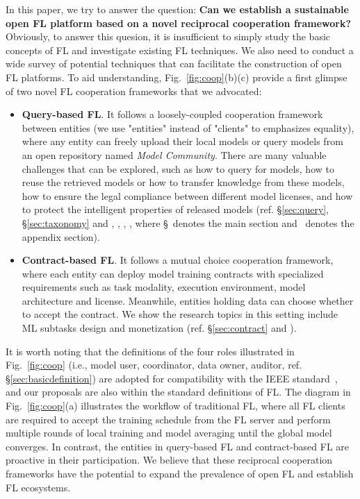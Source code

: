 In this paper, we try to answer the question: \textbf{Can we establish a sustainable open FL platform based on a novel reciprocal cooperation framework?}
Obviously, to answer this quesion, it is insufficient to simply study the basic concepts of FL and investigate existing FL techniques.
We also need to conduct a wide survey of potential techniques that can facilitate the construction of open FL platforms.
To aid understanding, Fig.~\ref{fig:coop}(b)(c) provide a first glimpse of two novel FL cooperation frameworks that we advocated: 
\begin{itemize}
    \item \textbf{Query-based FL}. It follows a loosely-coupled cooperation framework between entities (we use "entities" instead of "clients" to emphasizes equality), where any entity can freely upload their local models or query models from an open repository named \textit{Model Community}.
    There are many valuable challenges that can be explored, such as how to query for models, how to reuse the retrieved models or how to transfer knowledge from these models, how to ensure the legal compliance between different model licenses, and how to protect the intelligent properties of released models (ref. \S\ref{sec:query}, \S\ref{sec:taxonomy} and , , , , where \S~denotes the main section and \ddag~denotes the appendix section). %
    \item \textbf{Contract-based FL}. It follows a mutual choice cooperation framework, where each entity can deploy model training contracts with specialized requirements such as task modality, execution environment, model architecture and license. Meanwhile, entities holding data can choose whether to accept the contract.
    We show the research topics in this setting include ML subtasks design and monetization (ref. \S\ref{sec:contract} and ).
\end{itemize}
It is worth noting that the definitions of the four roles illustrated in Fig.~\ref{fig:coop} (i.e., model user, coordinator, data owner, auditor, ref. \S\ref{sec:basicdefinition}) are adopted for compatibility with the IEEE standard~\cite{IEEEstd3652}, and our proposals are also within the standard definitions of FL.
The diagram in Fig.~\ref{fig:coop}(a) illustrates the workflow of traditional FL, where all FL clients are required to accept the training schedule from the FL server and perform multiple rounds of local training and model averaging until the global model converges.
In contrast, the entities in query-based FL and contract-based FL are proactive in their participation.
We believe that these reciprocal cooperation frameworks have the potential to expand the prevalence of open FL and establish FL ecosystems.


